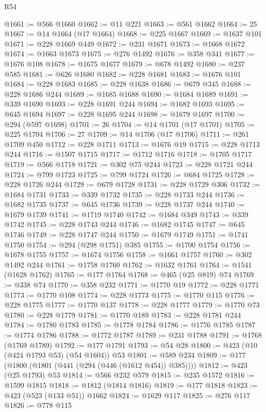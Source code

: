 \begin{lexlean}{R54}
\begin{coremodule}
@1661 := @566 @1660
@1662 := @11 @221
@1663 := @561 @1662
@1664 := 25
@1667 := @14 @1664 (@17 @1664)
@1668 := @225 @1667
@1669 := @1637 @101
@1671 := @228 @1669 @449
@1672 := @231 @1671
@1673 := @1668 @1672
@1674 := @1663 @1673
@1675 := @276 @1492
@1676 := @358 @341
@1677 := @1676 @108
@1678 := @1675 @1677
@1679 := @678 @1492
@1680 := @237 @585
@1681 := @626 @1680
@1682 := @228 @1681
@1683 := @1676 @101
@1684 := @228 @1683
@1685 := @228 @1638
@1686 := @679 @345
@1688 := @228 @1686 @244
@1689 := @1685 @1688
@1690 := @1684 @1689
@1691 := @339 @1690
@1693 := @228 @1691 @244
@1694 := @1682 @1693
@1695 := @645 @1694
@1697 := @228 @1695 @244
@1698 := @1679 @1697
@1700 := @294 (@597 @1698)
@1701 := 26
@1704 := @14 @1701 (@17 @1701)
@1705 := @225 @1704
@1706 := 27
@1709 := @14 @1706 (@17 @1706)
@1711 := @261 @1709 @450
@1712 := @228 @1711
@1713 := @1676 @19
@1715 := @228 @1713 @244
@1716 := @1507 @1715
@1717 := @1712 @1716
@1718 := @1705 @1717
@1719 := @566 @1718
@1721 := @302 @75 @244
@1723 := @228 @1721 @244
@1724 := @799 @1723
@1725 := @799 @1724
@1726 := @684 @1725
@1728 := @228 @1726 @244
@1729 := @679 @1728
@1731 := @228 @1729 @306
@1732 := @1684 @1731
@1733 := @339 @1732
@1735 := @228 @1733 @244
@1736 := @1682 @1735
@1737 := @645 @1736
@1739 := @228 @1737 @244
@1740 := @1679 @1739
@1741 := @1719 @1740
@1742 := @1684 @349
@1743 := @339 @1742
@1745 := @228 @1743 @244
@1746 := @1682 @1745
@1747 := @645 @1746
@1749 := @228 @1747 @244
@1750 := @1679 @1749
@1751 := @1741 @1750
@1754 := @294 (@298 @1751) @385
@1755 := @1700 @1754
@1756 := @1678 @1755
@1757 := @1674 @1756
@1758 := @1661 @1757
@1760 := @302 @1492 @244
@1761 := @1758 @1760
@1762 := @1632 @1761
@1764 := @1541 (@1628 @1762)
@1765 := @177 @1764
@1768 := @465 (@25 @819) @74
@1769 := @338 @74
@1770 := @358 @232
@1771 := @1770 @19
@1772 := @228 @1771
@1773 := @1770 @108
@1774 := @228 @1773
@1775 := @1770 @115
@1776 := @228 @1775
@1777 := @1770 @137
@1778 := @228 @1777
@1779 := @1770 @73
@1780 := @228 @1779
@1781 := @1770 @189
@1783 := @228 @1781 @244
@1784 := @1780 @1783
@1785 := @1778 @1784
@1786 := @1776 @1785
@1787 := @1774 @1786
@1788 := @1772 @1787
@1789 := @231 @1788
@1791 := @1768 (@1769 @1789)
@1792 := @177 @1791
@1793 := @54 @28
@1800 := @423 (@10 (@424 @1793 @53) (@54 @1604)) @53
@1801 := @589 @234
@1809 := @177 (@1800 (@1801 (@441 (@294 (@446 (@1612 @454)) @385))))
@1812 := @423 (@25 @1793) @53
@1814 := @566 @232 @579
@1815 := @235 @1572
@1816 := @1599 @1815
@1818 := @1812 (@1814 @1816)
@1819 := @177 @1818
@1823 := @423 (@523 (@133 @51)) @1662
@1824 := @1629 @117
@1825 := @276 @117
@1826 := @778 @115

\end{coremodule}
\end{lexlean}
